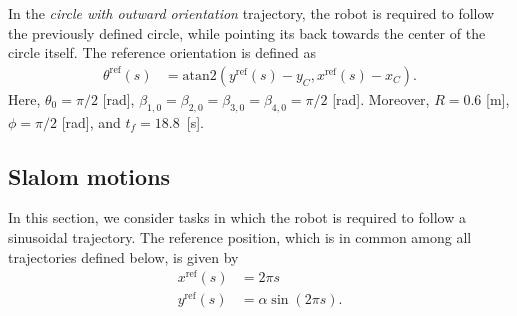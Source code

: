 In the \textit{circle with outward orientation} trajectory, the robot is required to follow the previously defined circle, while pointing its back towards the center of the circle itself. The reference orientation is defined as
\begin{subequations}
\begin{align*}
    \theta^{\mathrm{ref}}(s) &= \mathrm{atan2}(y^{\mathrm{ref}}(s) - y_C, x^{\mathrm{ref}}(s) - x_C).
\end{align*}
\end{subequations}
Here, $\theta_0=\pi/2$ [rad], $\beta_{1,0}=\beta_{2,0}=\beta_{3,0}=\beta_{4,0}=\pi/2$ [rad]. Moreover, $R=0.6$ [m], $\phi=\pi/2$ [rad], and $t_f=18.8$~[s]. %

\subsection{Slalom motions}
In this section, we consider tasks in which the robot is required to follow a sinusoidal trajectory. The reference position, which is in common among all trajectories defined below, is given by
\begin{subequations}
\begin{align*}
    x^{\mathrm{ref}}(s) &= 2 \pi s \\
    y^{\mathrm{ref}}(s) &= \alpha \sin(2 \pi s).
\end{align*}
\end{subequations}

